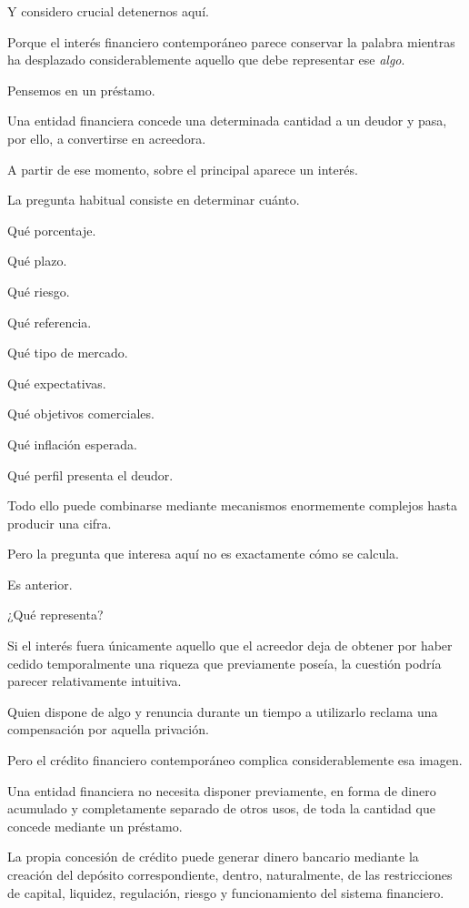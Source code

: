 \documentclass[12pt,a4paper]{article}
\begin{document}
Y considero crucial detenernos aquí.

Porque el interés financiero contemporáneo parece conservar la palabra mientras ha desplazado considerablemente aquello que debe representar ese \emph{algo}.

Pensemos en un préstamo.

Una entidad financiera concede una determinada cantidad a un deudor y pasa, por ello, a convertirse en acreedora.

A partir de ese momento, sobre el principal aparece un interés.

La pregunta habitual consiste en determinar cuánto.

Qué porcentaje.

Qué plazo.

Qué riesgo.

Qué referencia.

Qué tipo de mercado.

Qué expectativas.

Qué objetivos comerciales.

Qué inflación esperada.

Qué perfil presenta el deudor.

Todo ello puede combinarse mediante mecanismos enormemente complejos hasta producir una cifra.

Pero la pregunta que interesa aquí no es exactamente cómo se calcula.

Es anterior.

¿Qué representa?

Si el interés fuera únicamente aquello que el acreedor deja de obtener por haber cedido temporalmente una riqueza que previamente poseía, la cuestión podría parecer relativamente intuitiva.

Quien dispone de algo y renuncia durante un tiempo a utilizarlo reclama una compensación por aquella privación.

Pero el crédito financiero contemporáneo complica considerablemente esa imagen.

Una entidad financiera no necesita disponer previamente, en forma de dinero acumulado y completamente separado de otros usos, de toda la cantidad que concede mediante un préstamo.

La propia concesión de crédito puede generar dinero bancario mediante la creación del depósito correspondiente, dentro, naturalmente, de las restricciones de capital, liquidez, regulación, riesgo y funcionamiento del sistema financiero.
\end{document}
